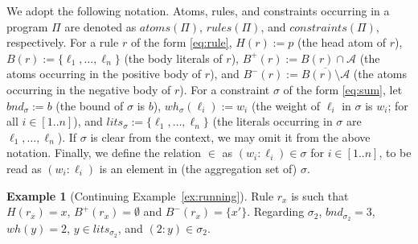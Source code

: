 \documentclass[preprint,authoryear]{elsarticle}
\theoremstyle{definition}
\newtheorem{example}{Example}[section]
\begin{document}
We adopt the following notation.
%
Atoms, rules, and constraints occurring in a program $\Pi$ are denoted as $\mathit{atoms}(\Pi)$, $\mathit{rules}(\Pi)$, and $\mathit{constraints}(\Pi)$, respectively.
%
For a rule $r$ of the form \eqref{eq:rule}, $H(r) := p$ (the head atom of $r$), 
$B(r) := \{\ell_1, \ldots, \ell_n\}$ (the body literals of $r$),
$B^+(r) := B(r) \cap \mathcal{A}$ (the atoms occurring in the positive body of $r$), and
$B^-(r) := \overline{B(r)  \setminus \mathcal{A}}$ (the atoms occurring in the negative body of $r$).
%
For a constraint $\sigma$ of the form \eqref{eq:sum}, let $\mathit{bnd}_\sigma := b$ (the bound of $\sigma$ is $b$),
$\mathit{wh}_\sigma(\ell_i) := w_i$ (the weight of $\ell_i$ in $\sigma$ is $w_i$; for all $i \in [1..n]$), and
$\mathit{lits}_\sigma := \{\ell_1, \ldots, \ell_n\}$ (the literals occurring in $\sigma$ are $\ell_1, \ldots, \ell_n$).
If $\sigma$ is clear from the context, 
we may omit it from the above notation.
Finally, we define 
the relation ${}\in{}$ as $(w_i : \ell_i) \in \sigma$ for $i \in [1..n]$, to be read as $(w_i : \ell_i)$ is an element in (the aggregation set of) $\sigma$.


\begin{example}[Continuing Example~\ref{ex:running}]\label{ex:notation}
Rule $r_x$ is such that $H(r_x) = x$, $B^+(r_x) = \emptyset$ and $B^-(r_x) = \{x'\}$.
Regarding $\sigma_2$, 
$\mathit{bnd}_{\sigma_2} = 3$,
$\mathit{wh}(y) = 2$,
$y \in \mathit{lits}_{\sigma_2}$, and
$(2 : y) \in \sigma_2$.
\end{example}
\end{document}

